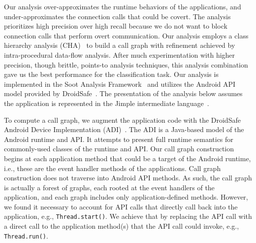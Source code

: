 Our analysis over-approximates the runtime
behaviors of the applications, and under-approximates the connection
calls that could be covert.
The analysis prioritizes high precision over high recall because we do
not want to block connection calls that perform overt
communication. Our analysis employs a class hierarchy analysis
(CHA)~\cite{Dean1995} to build a call graph with refinement achieved
by intra-procedural data-flow analysis.  After much experimentation
with higher precision, though brittle, points-to analysis techniques,
this analysis combination gave us the best performance for the
classification task.  Our analysis is implemented in the Soot Analysis
Framework~\cite{Vallee-Rai2000} and utilizes the Android API model
provided by
DroidSafe~\cite{Gordon:Kim:Perkins:Gilham:Nguyen:Rinard:NDSS15}. The
presentation of the analysis below assumes the application is
represented in the Jimple intermediate language~\cite{Vallee-Rai2000}.

To compute a call graph, we augment the application code with the
DroidSafe Android Device Implementation
(ADI)~\cite{Gordon:Kim:Perkins:Gilham:Nguyen:Rinard:NDSS15}.  The ADI
is a Java-based model of the Android runtime and API. It attempts to
present full runtime semantics for commonly-used classes of the
runtime and API.  Our call graph construction begins at each
application method that could be a target of the Android runtime, i.e., 
these are the event handler methods of the applications.  Call graph
construction does not traverse into Android API methods. 
As such, the call
graph is actually a forest of graphs, each rooted at the event
handlers of the application, and each graph includes only
application-defined methods.  However, we found it necessary to
account for API calls that directly call back into the application,
e.g., \lstinline!Thread.start()!. We achieve that by replacing the API call with a
direct call to the application method(s) that the API call could
invoke, e.g., \lstinline!Thread.run()!.




